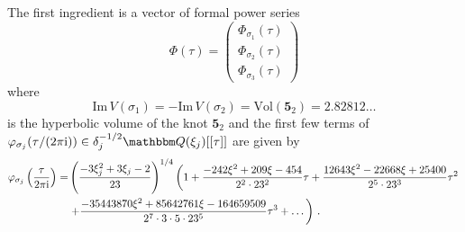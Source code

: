 \documentclass[12pt,reqno]{amsart}
\theoremstyle{definition}
\def\BQ{\mathbbm Q}
\def\s{\sigma}
\def\be{\begin{equation}}
\def\ee{\end{equation}}
\def\ri{\mathrm{i}}
\def\ri{{\rm i}}
\def\Im{\mathrm{Im}}
\def\md{\mathbf}
\newcommand{\knot}[1]{\md{#1}}
\begin{document}
The first ingredient is a vector of formal power series
%
\be\Phi(\tau)=
\begin{pmatrix} \Phi_{\s_1}(\tau)\\ \Phi_{\s_2}(\tau) \\
\Phi_{\s_3}(\tau) \end{pmatrix}
\ee
%
where 
%
\begin{equation}
  \label{volume-52}
  \Im\,V(\s_1) = -\Im\,V(\s_2) =\text{Vol}(\knot{5}_2)= 2.82812\ldots
\end{equation}
%
is the hyperbolic volume of the knot $\knot{5}_2$ and the first few
terms of
$\varphi_{\s_j}(\tau/(2\pi \ri)) \in \delta_j^{-1/2}
\BQ(\xi_j)[[\tau]]$ are given by 
{\small
\begin{align}
\label{varphi52}
  \varphi_{\s_j}\left(\frac{\tau}{2\pi \ri}\right) =
  &\left(\frac{-3\xi_j^2+3\xi_j-2}{23}\right)^{1/4}
    \left(1+\frac{-242\xi^2+209\xi-454}{2^2\cdot 23^2}\tau
    +\frac{12643\xi^2-22668\xi+25400}{2^5\cdot 23^3}\tau^2\right.
  \\
  \notag
  &\left.+\frac{-35443870\xi^2+85642761\xi-164659509}
    {2^7\cdot 3\cdot 5\cdot 23^5}\tau^3 + \dots \right) \,.    
\end{align}
}
\end{document}
